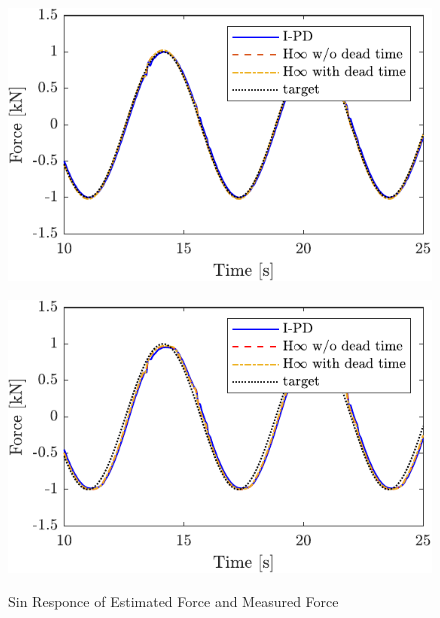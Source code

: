 \begin{figure}[t]
    \begin{minipage}{\minipageratio\hsize}
    \centering
        \includegraphics[keepaspectratio, scale = \minifigscale]{contents/ForceControl/figure/1115/crop-1115_diff_estforce_sin.pdf}
        \label{fig4:crop-1115_diff_estforce_sin}
    \end{minipage}
    \begin{minipage}{\minipageratio\hsize}
    \centering
        \includegraphics[keepaspectratio, scale = \minifigscale]{contents/ForceControl/figure/1115/crop-1115_diff_force_sin.pdf}
        \label{fig4:crop-1115_diff_force_sin}
    \end{minipage}
    \caption{Sin Responce of Estimated Force and Measured Force}
    \label{fig4:crop-1115_diff_sin}
\end{figure}

